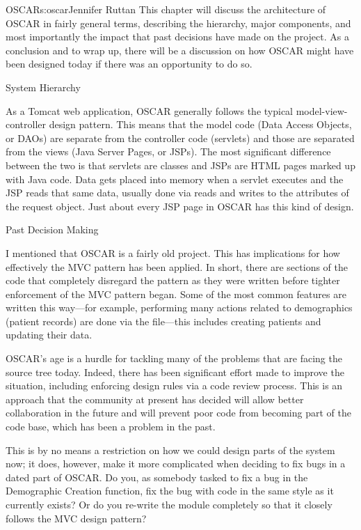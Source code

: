 \begin{aosachapter}{OSCAR}{s:oscar}{Jennifer Ruttan}
This chapter will discuss the architecture of OSCAR in fairly general
terms, describing the hierarchy, major components, and most
importantly the impact that past decisions have made on the
project. As a conclusion and to wrap up, there will be a discussion on
how OSCAR might have been designed today if there was an opportunity to do so.

\begin{aosasect1}{System Hierarchy}

As a Tomcat web application, OSCAR generally follows the typical
model-view-controller design pattern. This means that the model code
(Data Access Objects, or DAOs) are separate from the controller code
(servlets) and those are separated from the views (Java Server Pages,
or JSPs). The most significant difference between the two is that
servlets are classes and JSPs are HTML pages marked up with Java
code. Data gets placed into memory when a servlet executes and the JSP
reads that same data, usually done via reads and writes to the
attributes of the request object. Just about every JSP page in OSCAR
has this kind of design.

\end{aosasect1}

\begin{aosasect1}{Past Decision Making}

I mentioned that OSCAR is a fairly old project. This has implications
for how effectively the MVC pattern has been applied. In short, there
are sections of the code that completely disregard the pattern as they
were written before tighter enforcement of the MVC pattern began. Some
of the most common features are written this way---for example,
performing many actions related to demographics (patient records) are
done via the  file---this includes
creating patients and updating their data.

OSCAR's age is a hurdle for tackling many of the problems that are
facing the source tree today. Indeed, there has been significant
effort made to improve the situation, including enforcing design rules
via a code review process. This is an approach that the community at
present has decided will allow better collaboration in the future and
will prevent poor code from becoming part of the code base, which has
been a problem in the past.

This is by no means a restriction on how we could design parts of the
system now; it does, however, make it more complicated when deciding
to fix bugs in a dated part of OSCAR. Do you, as somebody tasked to
fix a bug in the Demographic Creation function, fix the bug with code
in the same style as it currently exists? Or do you re-write the
module completely so that it closely follows the MVC design pattern?


\end{aosasect1}
\end{aosachapter}
